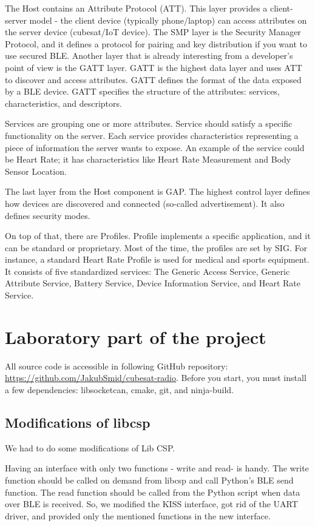 \documentclass[conference]{IEEEtran}
\begin{document}
The Host contains an Attribute Protocol (ATT). This layer provides a client-server model - the client device (typically phone/laptop) can access attributes on the server device (cubesat/IoT device). The SMP layer is the Security Manager Protocol, and it defines a protocol for pairing and key distribution if you want to use secured BLE.
Another layer that is already interesting from a developer's point of view is the GATT layer. GATT is the highest data layer and uses ATT to discover and access attributes. GATT defines the format of the data exposed by a BLE device. GATT specifies the structure of the attributes: services, characteristics, and descriptors.

Services are grouping one or more attributes. Service should satisfy a specific functionality on the server. Each service provides characteristics representing a piece of information the server wants to expose. An example of the service could be Heart Rate; it has characteristics like Heart Rate Measurement and Body Sensor Location.

The last layer from the Host component is GAP. The highest control layer defines how devices are discovered and connected (so-called advertisement). It also defines security modes.

On top of that, there are Profiles. Profile implements a specific application, and it can be standard or proprietary. Most of the time, the profiles are set by SIG. For instance, a standard Heart Rate Profile is used for medical and sports equipment. It consists of five standardized services: The Generic Access Service, Generic Attribute Service, Battery Service, Device Information Service, and Heart Rate Service. \cite{embeddedcentric}

\section{Laboratory part of the project}
All source code is accessible in following GitHub repository: \url{https://github.com/JakubSmid/cubesat-radio}.
Before you start, you must install a few dependencies: libsocketcan, cmake, git, and ninja-build.
\subsection{Modifications of libcsp}
We had to do some modifications of Lib CSP.

Having an interface with only two functions - write and read- is handy. The write function should be called on demand from libcsp and call Python's BLE send function. The read function should be called from the Python script when data over BLE is received. So, we modified the KISS interface, got rid of the UART driver, and provided only the mentioned functions in the new interface.
 
\end{document}
